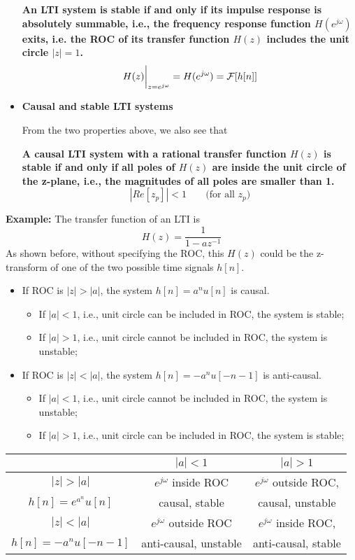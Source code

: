\begin{itemize}
  {\bf An LTI system is stable if and only if its impulse response is absolutely
    summable, i.e., the frequency response function $H(e^{j\omega})$ exits, i.e. the
    ROC of its transfer function $H(z)$ includes the unit circle $|z|=1$.}
  \[ H(z)\bigg|_{z=e^{j\omega}}=H(e^{j\omega})={\cal F}[h[n]] \]

\item {\bf Causal and stable LTI systems}

  From the two properties above, we also see that

  {\bf A causal LTI system with a rational transfer function $H(z)$ is stable 
    if and only if all poles of $H(z)$ are inside the unit circle of the z-plane, 
    i.e., the magnitudes of all poles are smaller than 1.}
  \[ |Re[z_p]|<1\;\;\;\;\;\;\;\mbox{(for all $z_p$)} \]


\end{itemize}

{\bf Example: } The transfer function of an LTI is
\[	H(z)=\frac{1}{1-az^{-1}}	\]
As shown before, without specifying the ROC, this $H(z)$ could be the z-transform
of one of the two possible time signals $h[n]$.
\begin{itemize}
\item If ROC is $|z|>|a|$, the system $h[n]=a^n u[n]$ is causal.
	\begin{itemize}
	\item If $|a|<1$, i.e., unit circle can be included in ROC, the 
		system is stable;
	\item If $|a|>1$, i.e., unit circle cannot be included in ROC, the 
		system is unstable;
	\end{itemize}
\item If ROC is $|z|<|a|$, the system $h[n]=-a^n u[-n-1]$ is anti-causal.
	\begin{itemize}
	\item If $|a|<1$, i.e., unit circle cannot be included in ROC, the 
		system is unstable;
	\item If $|a|>1$, i.e., unit circle can be included in ROC, the 
		system is stable;
	\end{itemize}
\end{itemize}

\vskip 0.2in
\begin{tabular}{c||c|c} \hline 
		& $|a|<1$			& $|a|>1$		\\ \hline \hline
  $|z|>|a|$	& $e^{j\omega}$ inside ROC & $e^{j\omega}$ outside ROC, \\
  $h[n]=e^a^nu[n]$& causal, stable & causal, unstable  \\ \hline
  $|z|<|a|$	& $e^{j\omega}$ outside ROC & $e^{j\omega}$ inside ROC, \\
  $h[n]=-a^nu[-n-1]$ 	& anti-causal, unstable & anti-causal, stable  \\ \hline
\end{tabular}

